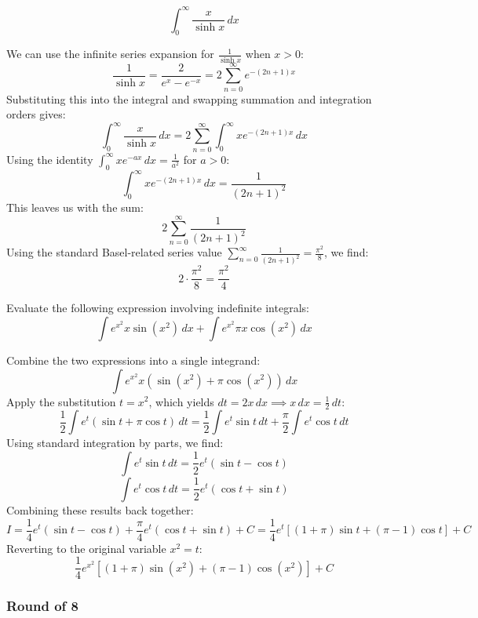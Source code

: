 \begin{questions}
\question
\[ \int_{0}^{\infty} \frac{x}{\sinh x} \,dx \]
\begin{solution}
We can use the infinite series expansion for $\frac{1}{\sinh x}$ when $x > 0$:
\[ \frac{1}{\sinh x} = \frac{2}{e^x - e^{-x}} = 2 \sum_{n=0}^{\infty} e^{-(2n+1)x} \]
Substituting this into the integral and swapping summation and integration orders gives:
\[ \int_{0}^{\infty} \frac{x}{\sinh x} \,dx = 2 \sum_{n=0}^{\infty} \int_{0}^{\infty} x e^{-(2n+1)x} \,dx \]
Using the identity $\int_{0}^{\infty} x e^{-ax} \,dx = \frac{1}{a^2}$ for $a > 0$:
\[ \int_{0}^{\infty} x e^{-(2n+1)x} \,dx = \frac{1}{(2n + 1)^2} \]
This leaves us with the sum:
\[ 2 \sum_{n=0}^{\infty} \frac{1}{(2n + 1)^2} \]
Using the standard Basel-related series value $\sum_{n=0}^{\infty} \frac{1}{(2n+1)^2} = \frac{\pi^2}{8}$, we find:
\[ 2 \cdot \frac{\pi^2}{8} = \frac{\pi^2}{4} \]
\end{solution}

\question
Evaluate the following expression involving indefinite integrals:
\[ \int e^{x^2} x \sin(x^2) \,dx + \int e^{x^2} \pi x \cos(x^2) \,dx \]
\begin{solution}
Combine the two expressions into a single integrand:
\[ \int e^{x^2} x \left( \sin(x^2) + \pi \cos(x^2) \right) \,dx \]
Apply the substitution $t = x^2$, which yields $dt = 2x \,dx \implies x \,dx = \frac{1}{2} \,dt$:
\[ \frac{1}{2} \int e^t (\sin t + \pi \cos t) \,dt = \frac{1}{2} \int e^t \sin t \,dt + \frac{\pi}{2} \int e^t \cos t \,dt \]
Using standard integration by parts, we find:
\[ \int e^t \sin t \,dt = \frac{1}{2}e^t(\sin t - \cos t) \]
\[ \int e^t \cos t \,dt = \frac{1}{2}e^t(\cos t + \sin t) \]
Combining these results back together:
\[ I = \frac{1}{4}e^t(\sin t - \cos t) + \frac{\pi}{4}e^t(\cos t + \sin t) + C = \frac{1}{4} e^t \left[ (1 + \pi)\sin t + (\pi - 1)\cos t \right] + C \]
Reverting to the original variable $x^2 = t$:
\[ \frac{1}{4} e^{x^2} \left[ (1 + \pi)\sin(x^2) + (\pi - 1)\cos(x^2) \right] + C \]
\end{solution}

\end{questions}

\subsubsection*{Round of 8}

